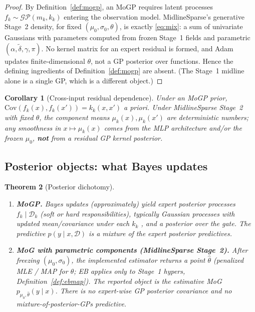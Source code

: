 \documentclass[11pt,a4paper]{article}
\theoremstyle{plain}
\newtheorem{theorem}{Theorem}[section]
\newtheorem{corollary}[theorem]{Corollary}
\theoremstyle{definition}
\theoremstyle{remark}
\newcommand{\GP}{\mathcal{GP}}
\newcommand{\D}{\mathcal{D}}
\newcommand{\tht}{\theta}
\begin{document}
\begin{proof}
By Definition~\ref{def:mogp}, an MoGP requires latent processes \(f_k\sim\GP(m_k,k_k)\)
entering the observation model. MidlineSparse's generative Stage~2 density, for fixed
\((\mu_0,\sigma_0,\tht)\), is exactly \eqref{eq:mix}: a sum of univariate Gaussians
with parameters computed from frozen Stage~1 fields and parametric
\((\alpha,\tilde\delta,\gamma,\pi)\). No kernel matrix for an expert residual is formed,
and Adam updates finite-dimensional \(\tht\), not a GP posterior over functions.
Hence the defining ingredients of Definition~\ref{def:mogp} are absent.
(The Stage~1 midline alone is a single GP, which is a different object.)
\end{proof}

\begin{corollary}[Cross-input residual dependence]
\label{cor:cross-input}
Under an MoGP prior, \(\mathrm{Cov}(f_k(x),f_k(x'))=k_k(x,x')\) a priori.
Under MidlineSparse Stage~2 with fixed \(\tht\), the component means
\(\mu_k(x),\mu_k(x')\) are deterministic numbers; any smoothness in
\(x\mapsto\mu_k(x)\) comes from the MLP architecture and/or the frozen \(\mu_0\),
\textbf{not} from a residual GP kernel posterior.
\end{corollary}

\subsection{Posterior objects: what Bayes updates}
\begin{theorem}[Posterior dichotomy]
\label{thm:mog-vs-mogp-posterior}
\begin{enumerate}[label=(\roman*)]
  \item \textbf{MoGP.} Bayes updates (approximately) yield expert posterior processes
        \(f_k\mid\D_k\) (soft or hard responsibilities), typically Gaussian processes
        with updated mean/covariance under each \(k_k\)
        \citep{Tresp2001,RasmussenWilliams2006}, and a posterior over the gate.
        The predictive \(p(y\mid x,\D)\) is a mixture of the expert posterior predictives.
  \item \textbf{MoG with parametric components (MidlineSparse Stage~2).}
        After freezing \((\mu_0,\sigma_0)\), the implemented estimator returns a point
        \(\hat\tht\) (penalized MLE / MAP for \(\tht\); EB applies only to Stage~1
        hypers, Definition~\ref{def:ebmap}). The reported object is the estimative MoG
        \(p_{\mu_0,\hat\tht}(y\mid x)\). There is no expert-wise GP posterior covariance
        and no mixture-of-posterior-GPs predictive.
\end{enumerate}
\end{theorem}
\end{document}
